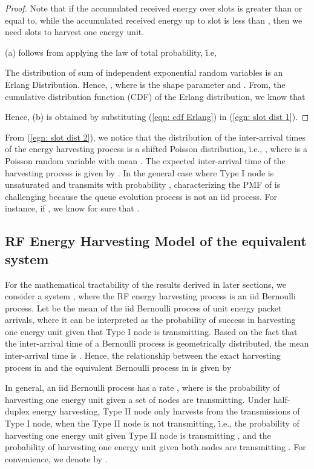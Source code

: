 \documentclass[draftcls,12pt,onecolumn]{IEEEtran}
\begin{document}
\begin{proof}
Note that if the accumulated received energy over  slots is greater than or equal to,  while the accumulated received energy up to slot  is less than , then we need  slots to harvest one energy unit.

(a) follows from applying the law of total probability, \.i.e, 
  
The distribution of sum of independent exponential random variables is an Erlang Distribution. Hence, , where  is the shape parameter and . From, the cumulative distribution function (CDF) of the Erlang distribution, we know that   

Hence, (b) is obtained by substituting (\ref{eqn: cdf Erlang}) in (\ref{egn: slot dist 1}). 
\end{proof}
From (\ref{egn: slot dist 2}), we notice that the distribution of the inter-arrival times of the energy harvesting process is a shifted Poisson distribution, \.i.e., , where  is a Poisson random variable with mean . The expected inter-arrival time of the harvesting process is given by . In the general case where Type I node is unsaturated and transmits with probability , characterizing the PMF of  is challenging because the queue evolution process is not an iid process. For instance, if , we know for sure that .





\subsection{RF Energy Harvesting Model of the equivalent system }

For the mathematical tractability of the results derived in later sections, we consider a system , where the RF energy harvesting process is an iid Bernoulli process. Let  be the mean of the iid Bernoulli process of unit energy packet arrivals, where it can be interpreted as the probability of success in harvesting one energy unit given that Type I node is transmitting. Based on the fact that the inter-arrival time of a Bernoulli process is geometrically distributed, the mean inter-arrival time is . Hence, the relationship between the exact harvesting process in  and the equivalent Bernoulli process in  is given by

\indent In general, an iid Bernoulli process has a rate , where  is the probability of harvesting one energy unit given a set of nodes  are transmitting. Under half-duplex energy harvesting, Type II node only harvests from the transmissions of Type I node, when the Type II node is not transmitting, \.i.e., the probability of harvesting one energy unit given Type II node is transmitting , and the probability of harvesting one energy unit given both nodes are transmitting . For convenience, we denote  by . 
\end{document}
